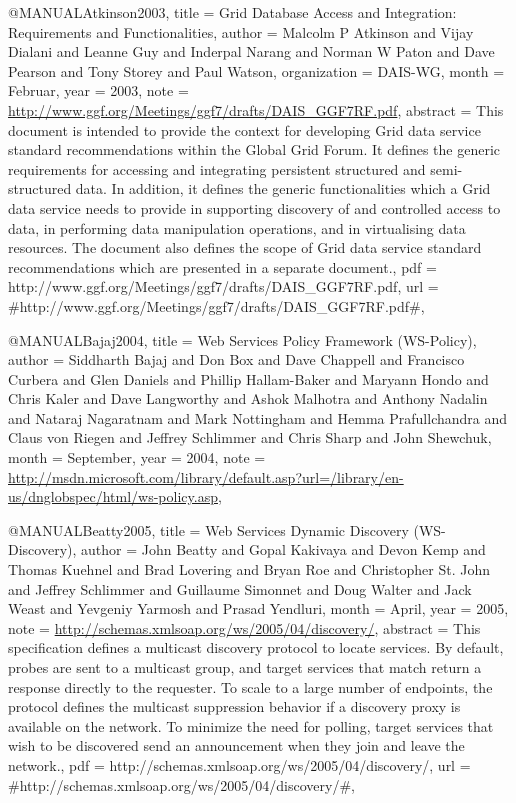 @MANUAL{Atkinson2003,
  title = {{Grid Database Access and Integration: Requirements and Functionalities}},
  author = {Malcolm P Atkinson and Vijay Dialani and Leanne Guy and Inderpal
	Narang and Norman W Paton and Dave Pearson and Tony Storey and Paul
	Watson},
  organization = {DAIS-WG},
  month = {Februar},
  year = {2003},
  note = {\url{http://www.ggf.org/Meetings/ggf7/drafts/DAIS_GGF7RF.pdf}},
  abstract = {This document is intended to provide the context for
developing Grid
	data service standard recommendations within the Global
Grid Forum.
	It defines the generic requirements for accessing and
integrating
	persistent structured and semi-structured data. In addition, it
defines
	the generic functionalities which a Grid data service needs to
provide
	in supporting discovery of and controlled access to data, in
performing
	data manipulation operations, and in virtualising data
resources.
	The document also defines the scope of Grid data service
standard
	recommendations which are presented in a separate document.},
  pdf = {http://www.ggf.org/Meetings/ggf7/drafts/DAIS_GGF7RF.pdf},
  url = {#http://www.ggf.org/Meetings/ggf7/drafts/DAIS_GGF7RF.pdf#},
}

@MANUAL{Bajaj2004,
  title = {{Web Services Policy Framework (WS-Policy)}},
  author = {Siddharth Bajaj and Don Box and Dave Chappell and Francisco Curbera
	and Glen Daniels and Phillip Hallam-Baker and Maryann Hondo and Chris
	Kaler and Dave Langworthy and Ashok Malhotra and Anthony Nadalin
	and Nataraj Nagaratnam and Mark Nottingham and Hemma Prafullchandra
	and Claus von Riegen and Jeffrey Schlimmer and Chris Sharp and John
	Shewchuk},
  month = {September},
  year = {2004},
  note = {\url{http://msdn.microsoft.com/library/default.asp?url=/library/en-us/dnglobspec/html/ws-policy.asp}},
}

@MANUAL{Beatty2005,
  title = {{Web Services Dynamic Discovery (WS-Discovery)}},
  author = {John Beatty and Gopal Kakivaya and Devon Kemp and Thomas Kuehnel
	and Brad Lovering and Bryan Roe and Christopher St. John and Jeffrey
	Schlimmer and Guillaume Simonnet and Doug Walter and Jack Weast and
	Yevgeniy Yarmosh and Prasad Yendluri},
  month = {April},
  year = {2005},
  note = {\url{http://schemas.xmlsoap.org/ws/2005/04/discovery/}},
  abstract = {This specification defines a multicast discovery protocol to locate
	services. By
default, probes are sent to a multicast group, and target
	services
that match return a response directly to the requester.
	To scale
to a large number of endpoints, the protocol defines the
	multicast
suppression behavior if a discovery proxy is available
	on the network.
To minimize the need for polling, target services
	that wish to be
discovered send an announcement when they join and
	leave the network.},
  pdf = {http://schemas.xmlsoap.org/ws/2005/04/discovery/},
  url = {#http://schemas.xmlsoap.org/ws/2005/04/discovery/#},
}

